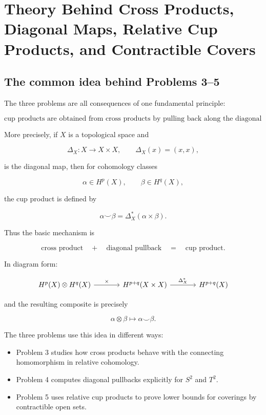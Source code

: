 \documentclass[12pt,a4paper]{article}
\theoremstyle{notespace}
\begin{document}

\section{Theory Behind Cross Products, Diagonal Maps, Relative Cup Products, and Contractible Covers}

\subsection{The common idea behind Problems 3--5}

The three problems are all consequences of one fundamental principle:

\[
\boxed{
	\text{cup products are obtained from cross products by pulling back along the diagonal map.}
}
\]

More precisely, if \(X\) is a topological space and

\[
\Delta_X:X\longrightarrow X\times X,
\qquad
\Delta_X(x)=(x,x),
\]

is the diagonal map, then for cohomology classes

\[
\alpha\in H^p(X),
\qquad
\beta\in H^q(X),
\]

the cup product is defined by

\[
\boxed{
	\alpha\smile \beta
	=
	\Delta_X^*(\alpha\times \beta).
}
\]

Thus the basic mechanism is

\[
\text{cross product}
\quad+\quad
\text{diagonal pullback}
\quad=\quad
\text{cup product}.
\]

In diagram form:

\[
\begin{tikzcd}[column sep=large]
	H^p(X)\otimes H^q(X)
	\arrow[r,"\times"]
	&
	H^{p+q}(X\times X)
	\arrow[r,"\Delta_X^*"]
	&
	H^{p+q}(X)
\end{tikzcd}
\]

and the resulting composite is precisely

\[
\alpha\otimes\beta
\longmapsto
\alpha\smile\beta.
\]

The three problems use this idea in different ways:

\begin{itemize}
	\item Problem 3 studies how cross products behave with the connecting homomorphism in relative cohomology.
	\item Problem 4 computes diagonal pullbacks explicitly for \(S^2\) and \(T^2\).
	\item Problem 5 uses relative cup products to prove lower bounds for coverings by contractible open sets.
\end{itemize}
\end{document}
